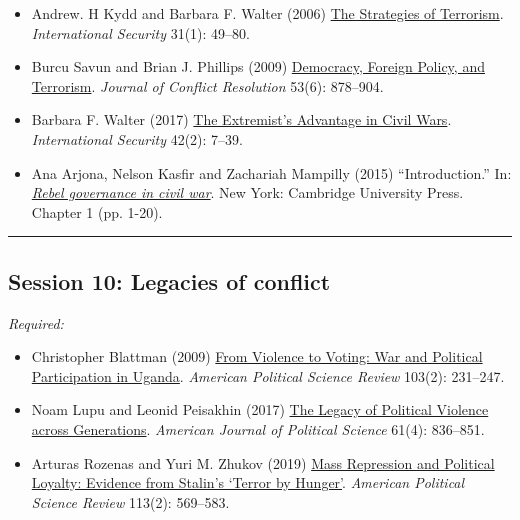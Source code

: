 \documentclass[12pt, a4paper]{article}
\begin{document}

\begin{itemize}
	\item Andrew. H Kydd and Barbara F. Walter (2006) \href{https://doi.org/10.1162/isec.2006.31.1.49}{The Strategies of Terrorism}. \textit{International Security} 31(1): 49--80.
	\item Burcu Savun and Brian J. Phillips (2009) \href{https://doi.org/10.1177/0022002709342978}{Democracy, Foreign Policy, and Terrorism}. \textit{Journal of Conflict Resolution} 53(6): 878--904.
	\item Barbara F. Walter (2017) \href{https://doi.org/10.1162/ISEC_a_00292}{The Extremist’s Advantage in Civil Wars}. \textit{International Security} 42(2): 7--39.
  \item Ana Arjona, Nelson Kasfir and Zachariah Mampilly (2015) ``Introduction.'' In: \href{https://www.cambridge.org/core/books/rebel-governance-in-civil-war/C40247AED4FA30DC2704EB64EA5CFFD5}{\textit{Rebel governance in civil war}}. New York: Cambridge University Press. Chapter 1 (pp. 1-20).
\end{itemize}

\vspace{20pt}
\hrule
\subsection*{Session 10: Legacies of conflict}

\noindent\textit{Required:}

\begin{itemize}
  \item Christopher Blattman (2009) \href{https://doi.org/10.1017/S0003055409090212}{From Violence to Voting: War and Political Participation in Uganda}. \textit{American Political Science Review} 103(2): 231--247.
  \item Noam Lupu and Leonid Peisakhin (2017) \href{https://doi.org/10.1111/ajps.12327}{The Legacy of Political Violence across Generations}. \textit{American Journal of Political Science} 61(4): 836--851.
  \item Arturas Rozenas and Yuri M. Zhukov (2019) \href{https://doi.org/10.1017/S0003055419000066}{Mass Repression and Political Loyalty: Evidence from Stalin’s ‘Terror by Hunger’}. \textit{American Political Science Review} 113(2): 569--583.
\end{itemize}
\end{document}
